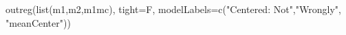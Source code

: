 \begin{Schunk}
\begin{Sinput}
 outreg(list(m1,m2,m1mc), tight=F, modelLabels=c("Centered: Not","Wrongly", "meanCenter"))
\end{Sinput}
\end{Schunk}
